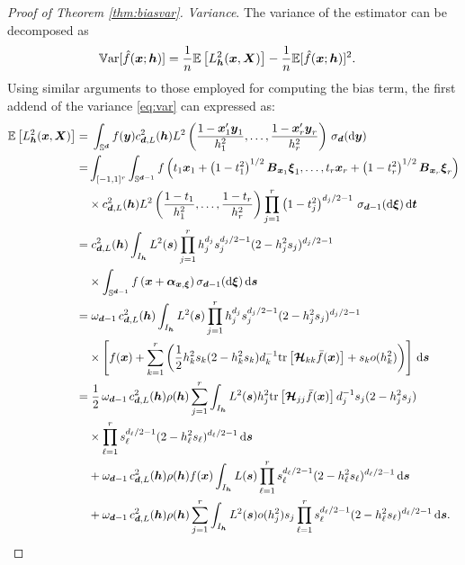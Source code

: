 \documentclass[oneside,11pt]{article}
\begin{document}
\begin{proof}[Proof of Theorem \ref{thm:biasvar}]
\textit{Variance}. The variance of the estimator can be decomposed as
\begin{align}\label{eq:var}
	\mathbb{V}\mathrm{ar}[\hat{f}(\boldsymbol{x};{\boldsymbol{h}})]=&\;\frac{1}{n}\mathbb{E}\left[L^2_{{\boldsymbol{h}}}(\boldsymbol{x},\boldsymbol{X})\right]-\frac{1}{n}\mathbb{E}[\hat{f}(\boldsymbol{x};{\boldsymbol{h}})]^2.
\end{align}
Using similar arguments to those employed for computing the bias term, the first addend of the variance \eqref{eq:var} can expressed as:
\begin{align}\label{eq:var_term1}
	\mathbb{E}\left[L^2_{{\boldsymbol{h}}}(\boldsymbol{x},\boldsymbol{X})\right]
        =&\;\int_{\mathbb{S}^{\boldsymbol{d}}}f(\boldsymbol{y})c^2_{\boldsymbol{d},L}({\boldsymbol{h}})L^2\left(\frac{1-\boldsymbol{x}_1' \boldsymbol{y}_1}{h_1^2},\ldots, \frac{1-\boldsymbol{x}_r' \boldsymbol{y}_r}{h_r^2}\right)\,\sigma_{\boldsymbol{d}}(\mathrm{d}\boldsymbol{y})\nonumber\\
        =&\int_{[-1,1]^r}\int_{\mathbb{S}^{\boldsymbol{d}-1}}f\left(t_1 \boldsymbol{x}_1+\left(1-t_1^2\right)^{1/2} \boldsymbol{B}_{\boldsymbol{x}_1} \boldsymbol\xi_1,\ldots,t_r \boldsymbol{x}_r+\left(1-t_r^2\right)^{1/2} \boldsymbol{B}_{\boldsymbol{x}_r} \boldsymbol\xi_r\right)\nonumber\\
	&\times c^2_{\boldsymbol{d},L}({\boldsymbol{h}})L^2\left(\frac{1-t_1}{h_1^2},\ldots, \frac{1-t_r}{h_r^2}\right) \prod_{j=1}^r \left(1-t_j^2\right)^{d_j/2-1}\,\sigma_{\boldsymbol{d}-1}(\mathrm{d}\boldsymbol\xi)\,\mathrm{d} \boldsymbol{t}\nonumber\\
        =&\; c^2_{\boldsymbol{d},L}({\boldsymbol{h}})\int_{I_{\boldsymbol{h}}} L^2(\boldsymbol{s})\prod_{j=1}^r h_j^{d_j}s_j^{d_j/2-1} (2-h_j^2s_j)^{d_j/2-1}\nonumber\\
        & \times \int_{\mathbb{S}^{\boldsymbol{d}-1}}f\left(\boldsymbol{x}+\boldsymbol\alpha_{\boldsymbol{x},\boldsymbol\xi}\right)\sigma_{\boldsymbol{d}-1}(\mathrm{d}\boldsymbol\xi)\,\mathrm{d} \boldsymbol{s}\nonumber\\
        =&\;\omega_{\boldsymbol{d}-1}\, c^2_{\boldsymbol{d},L}({\boldsymbol{h}}) \int_{I_{\boldsymbol{h}}}L^2(\boldsymbol{s})\prod_{j=1}^r h_j^{d_j}s_j^{d_j/2-1} (2-h_j^2s_j)^{d_j/2-1}\,\nonumber\\
	&\times\left[f(\boldsymbol{x})+\sum_{k=1}^r\left(\frac{1}{2}h_k^2s_k(2-h_k^2s_k)d_k^{-1}\mathrm{tr}\left[\boldsymbol{\mathcal{H}}_{kk}\bar{f}(\boldsymbol{x})\right]+s_ko(h_k^2)\right)\right]\,\mathrm{d} \boldsymbol{s}\nonumber\\
         =&\;\frac{1}{2} \, \omega_{\boldsymbol{d}-1}\, c^2_{\boldsymbol{d},L}({\boldsymbol{h}})\rho({\boldsymbol{h}}) \sum_{j=1}^r\int_{I_{\boldsymbol{h}}}L^2(\boldsymbol{s})h_j^2\mathrm{tr}\left[\boldsymbol{\mathcal{H}}_{jj}\bar{f}(\boldsymbol{x})\right]d_j^{-1}s_j (2-h_j^2s_j)\,\nonumber\\
         &\times \prod_{\ell=1}^r s_\ell^{d_\ell/2-1} (2-h_\ell^2s_\ell)^{d_\ell/2-1} \,\mathrm{d} \boldsymbol{s}\nonumber\\
         &+\omega_{\boldsymbol{d}-1}\,  c^2_{\boldsymbol{d},L}({\boldsymbol{h}}) \rho({\boldsymbol{h}})f(\boldsymbol{x})\int_{I_{\boldsymbol{h}}}L(\boldsymbol{s})\prod_{\ell=1}^r s_\ell^{d_\ell/2-1} (2-h_\ell^2s_\ell)^{d_\ell/2-1}  \,\mathrm{d} \boldsymbol{s}\nonumber\\
         &+\omega_{\boldsymbol{d}-1}\,  c^2_{\boldsymbol{d},L}({\boldsymbol{h}}) \rho({\boldsymbol{h}})\sum_{j=1}^r\int_{I_{\boldsymbol{h}}}L^2(\boldsymbol{s})o(h_j^2)s_j\prod_{\ell=1}^r s_\ell^{d_\ell/2-1} (2-h_\ell^2s_\ell)^{d_\ell/2-1}  \,\mathrm{d} \boldsymbol{s}.
\end{align}


\end{proof}
\end{document}
